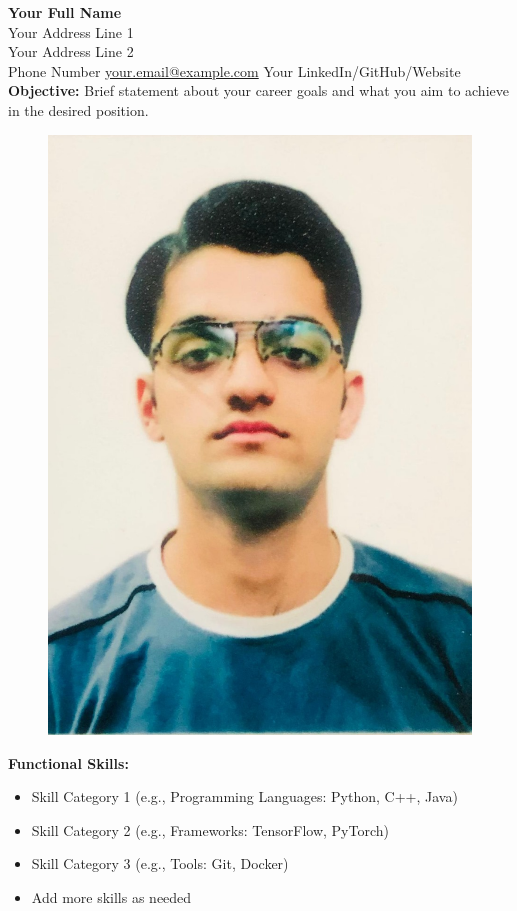 \documentclass[a4paper,10pt]{article}
\begin{document}


\begin{minipage}[t]{0.68\textwidth}
    {\LARGE \textbf{Your Full Name}}\\
    Your Address Line 1\\
    Your Address Line 2\\
    Phone Number \textbar{} \href{mailto:your.email@example.com}{your.email@example.com} \textbar{} Your LinkedIn/GitHub/Website\\
    \vspace{5pt}
    \textbf{Objective:} Brief statement about your career goals and what you aim to achieve in the desired position.
\end{minipage}
\begin{minipage}[t]{0.28\textwidth}
    \begin{flushright}
    \begin{figure}
    \includegraphics[width=0.4 \textwidth]{WhatsApp Image 2024-09-13 at 14.26.56_f42a4fb7.jpg}
    \end{figure}
    \end{flushright}
\end{minipage}

\vspace{10pt}

\textbf{Functional Skills:}
\begin{itemize}
    \item Skill Category 1 (e.g., Programming Languages: Python, C++, Java)
    \item Skill Category 2 (e.g., Frameworks: TensorFlow, PyTorch)
    \item Skill Category 3 (e.g., Tools: Git, Docker)
    \item Add more skills as needed
\end{itemize}
\end{document}
